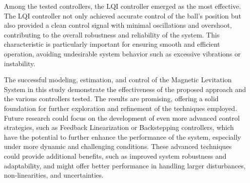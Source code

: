 Among the tested controllers, the LQI controller emerged as the most effective.
The LQI controller not only achieved accurate control of the ball's position but also provided a clean control signal with minimal oscillations and overshoot, contributing to the overall robustness and reliability of the system.
This characteristic is particularly important for ensuring smooth and efficient operation, avoiding undesirable system behavior such as excessive vibrations or instability.

The successful modeling, estimation, and control of the Magnetic Levitation System in this study demonstrate the effectiveness of the proposed approach and the various controllers tested.
The results are promising, offering a solid foundation for further exploration and refinement of the techniques employed.
Future research could focus on the development of even more advanced control strategies, such as Feedback Linearization or Backstepping controllers, which have the potential to further enhance the performance of the system, especially under more dynamic and challenging conditions.
These advanced techniques could provide additional benefits, such as improved system robustness and adaptability, and might offer better performance in handling larger disturbances, non-linearities, and uncertainties.